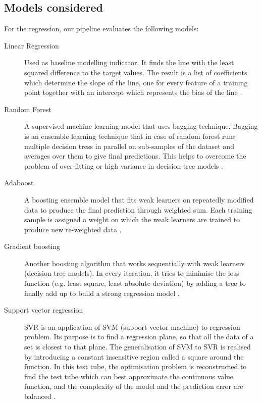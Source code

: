 \subsection{Models considered}
For the regression, our pipeline evaluates the following models:
\begin{description}
\item[Linear Regression] Used as baseline modelling indicator. It finds the line with the least squared difference to the target values. The result is a list of coefficients which determine the slope of the line, one for every feature of a training point together with an intercept which represents the bias of the line \cite{Pedregosa2011}.

\item[Random Forest] A supervised machine learning model that uses bagging technique. Bagging is an ensemble learning technique that in case of random forest runs multiple decision tress in parallel on sub-samples of the dataset and averages over them to give final predictions. This helps to overcome the problem of over-fitting or high variance in decision tree models \cite{Breiman2001a}. 

\item[Adaboost] A boosting ensemble model that fits weak learners on repeatedly modified data to produce the final prediction through weighted sum. Each training sample is assigned a weight on which the weak learners are trained to produce new re-weighted data \cite{adaboost}. 

\item[Gradient boosting] Another boosting algorithm that works sequentially with weak learners (decision tree models). In every iteration, it tries to minimise the loss function (e.g. least square, least absolute deviation) by adding a tree to finally add up to build a strong regression model \cite{Pedregosa2011}.

\item[Support vector regression] SVR is an application of SVM (support vector machine) to regression problem. Its purpose is to find a regression plane, so that all the data of a set is closest to that plane. The generalisation of SVM to SVR is realised by introducing a constant insensitive region called a square around the function. In this test tube, the optimisation problem is reconstructed to find the test tube which can best approximate the continuous value function, and the complexity of the model and the prediction error are balanced \cite{efficientLearningMachines}.


\end{description}
